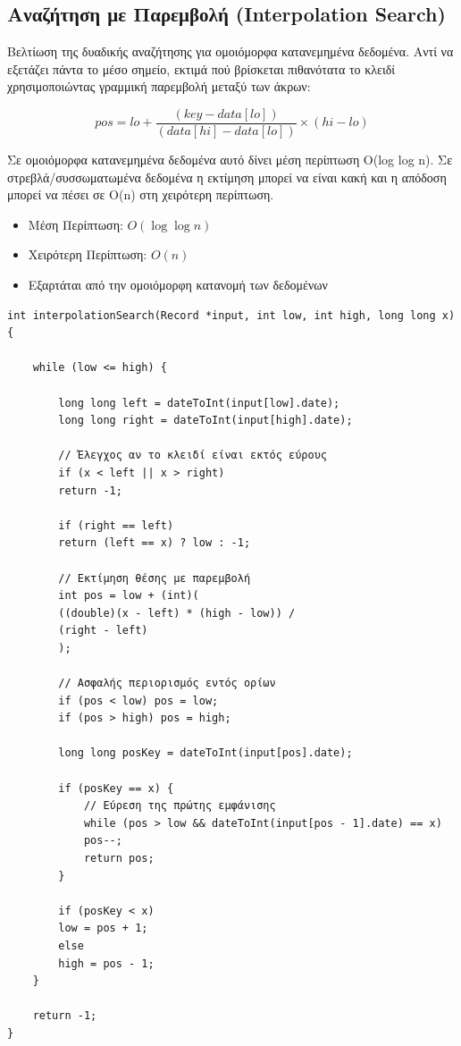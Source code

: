 \documentclass[a4paper,12pt]{article}
\begin{document}
	\subsection{Αναζήτηση με Παρεμβολή (Interpolation Search)}
	
	Βελτίωση της δυαδικής αναζήτησης για ομοιόμορφα κατανεμημένα δεδομένα. Αντί να εξετάζει πάντα το μέσο σημείο, εκτιμά πού βρίσκεται πιθανότατα το κλειδί χρησιμοποιώντας γραμμική παρεμβολή μεταξύ των άκρων:
	
	\[
	pos = lo + \frac{(key - data[lo])}{(data[hi] - data[lo])} \times (hi - lo)
	\]
	
	Σε ομοιόμορφα κατανεμημένα δεδομένα αυτό δίνει μέση περίπτωση O(log log n). Σε στρεβλά/συσσωματωμένα δεδομένα η εκτίμηση μπορεί να είναι κακή και η απόδοση μπορεί να πέσει σε O(n) στη χειρότερη περίπτωση.
	
	\begin{itemize}
		\item Μέση Περίπτωση: $O(\log \log n)$
		\item Χειρότερη Περίπτωση: $O(n)$
		\item Εξαρτάται από την ομοιόμορφη κατανομή των δεδομένων
	\end{itemize}
	
	\begin{lstlisting}[caption=Υλοποίηση Interpolation Search]
int interpolationSearch(Record *input, int low, int high, long long x) {
	
	while (low <= high) {
		
		long long left = dateToInt(input[low].date);
		long long right = dateToInt(input[high].date);
		
		// Έλεγχος αν το κλειδί είναι εκτός εύρους
		if (x < left || x > right)
		return -1;
		
		if (right == left)
		return (left == x) ? low : -1;
		
		// Εκτίμηση θέσης με παρεμβολή
		int pos = low + (int)(
		((double)(x - left) * (high - low)) /
		(right - left)
		);
		
		// Ασφαλής περιορισμός εντός ορίων
		if (pos < low) pos = low;
		if (pos > high) pos = high;
		
		long long posKey = dateToInt(input[pos].date);
		
		if (posKey == x) {
			// Εύρεση της πρώτης εμφάνισης
			while (pos > low && dateToInt(input[pos - 1].date) == x)
			pos--;
			return pos;
		}
		
		if (posKey < x)
		low = pos + 1;
		else
		high = pos - 1;
	}
	
	return -1;
}
	\end{lstlisting}
	
\end{document}
